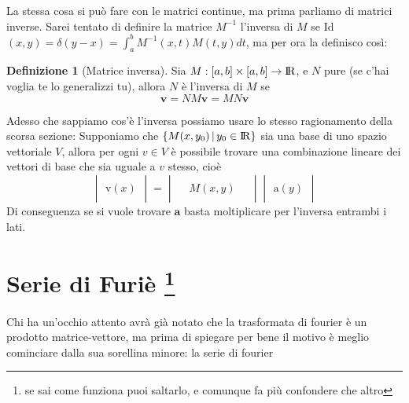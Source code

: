 \documentclass[11pt,a4paper]{report}
\newcommand{\vettore}[1]{\mathbf{#1}}
\newcommand{\vettorec}[1]{\textrm{#1}}
\theoremstyle{definition}
\newtheorem{definizione}{Definizione}
\theoremstyle{plain}
\theoremstyle{plain}
\begin{document}
			La stessa cosa si può fare con le matrici continue, ma prima parliamo di matrici inverse.\newline
			Sarei tentato di definire la matrice $M^{-1}$ l'inversa di $M$ se Id$(x,y)=\delta (y-x)=\int_a^b M^{-1}(x,t) M(t,y) dt$, ma per ora la definisco così:\newline
			\begin{definizione}[Matrice inversa]
				Sia $M:[a,b]\times [a,b]\rightarrow \rm I\!R$, e $N$ pure (se c'hai voglia te lo generalizzi tu), allora $N$ è l'inversa di $M$ se
				\begin{equation}
					\vettore v=NM\vettore v=MN\vettore v
				\end{equation}
			\end{definizione}
			Adesso che sappiamo cos'è l'inversa possiamo usare lo stesso ragionamento della scorsa sezione: Supponiamo che $\{M(x,y_0)\,|\, y_0\in \rm I\!R \}$ sia una base di uno spazio vettoriale $V$, allora per ogni $v\in V$ è possibile trovare una combinazione lineare dei vettori di base che sia uguale a $v$ stesso, cioè
			\begin{equation}
			\label{combinazione lineare matrice}
				\begin{vmatrix}
					\\
					\vettorec v(x)\\
					\quad
				\end{vmatrix}
				=
				\begin{vmatrix}
					\, & & \, \\
					& M(x,y) & \\
					& & 
				\end{vmatrix}
				\begin{vmatrix}
					\\
					\vettorec a(y)\\
					\quad
				\end{vmatrix}
			\end{equation}
			Di conseguenza se si vuole trovare $\vettore a$ basta moltiplicare per l'inversa entrambi i lati.



		\section{Serie di Furiè \protect\footnote{se sai come funziona puoi saltarlo, e comunque fa più confondere che altro}}
			Chi ha un'occhio attento avrà già notato che la trasformata di fourier è un prodotto matrice-vettore, ma prima di spiegare per bene il motivo è meglio cominciare dalla sua sorellina minore: la serie di fourier\newline 
\end{document}
